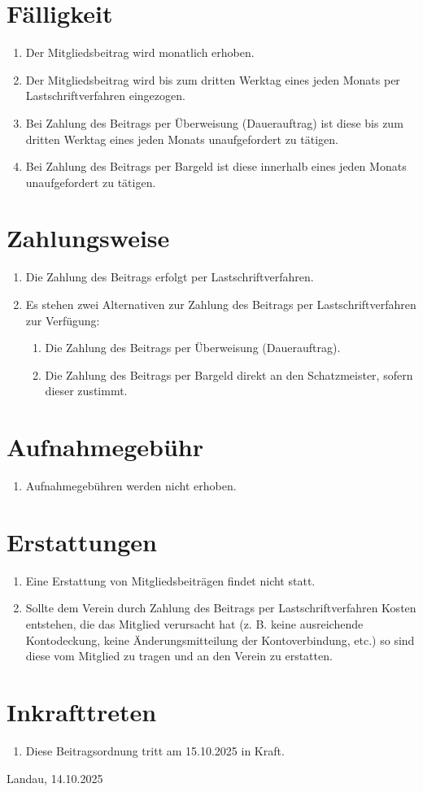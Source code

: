 \documentclass[a4paper, 12pt]{scrartcl}
\begin{document}
\section{Fälligkeit}
\begin{enumerate}
	\item Der Mitgliedsbeitrag wird monatlich erhoben.
	\item Der Mitgliedsbeitrag wird bis zum dritten Werktag eines jeden Monats per Lastschriftverfahren eingezogen.
	\item Bei Zahlung des Beitrags per Überweisung (Dauerauftrag) ist diese bis zum dritten Werktag eines jeden Monats unaufgefordert zu tätigen.
	\item Bei Zahlung des Beitrags per Bargeld ist diese innerhalb eines jeden Monats unaufgefordert zu tätigen.
\end{enumerate}

\section{Zahlungsweise}
\begin{enumerate}
	\item Die Zahlung des Beitrags erfolgt per Lastschriftverfahren.
	\item Es stehen zwei Alternativen zur Zahlung des Beitrags per Lastschriftverfahren zur Verfügung:
	\begin{enumerate}
    	\item Die Zahlung des Beitrags per Überweisung (Dauerauftrag).
        \item Die Zahlung des Beitrags per Bargeld direkt an den Schatzmeister, sofern dieser zustimmt.
    \end{enumerate}
\end{enumerate}

\section{Aufnahmegebühr}
\begin{enumerate}
	\item Aufnahmegebühren werden nicht erhoben.
\end{enumerate}

\section{Erstattungen}
\begin{enumerate}
	\item Eine Erstattung von Mitgliedsbeiträgen findet nicht statt.
	\item Sollte dem Verein durch Zahlung des Beitrags per Lastschriftverfahren Kosten entstehen, die das Mitglied verursacht hat (z. B. keine ausreichende Kontodeckung, keine Änderungsmitteilung der Kontoverbindung, etc.) so sind diese vom Mitglied zu tragen und an den Verein zu erstatten.
\end{enumerate}

\section{Inkrafttreten}\label{inkrafttreten}
\begin{enumerate}
	\item Diese Beitragsordnung tritt am 15.10.2025 in Kraft.
\end{enumerate}

\vspace{1.5cm}

\noindent Landau, 14.10.2025
\end{document}
